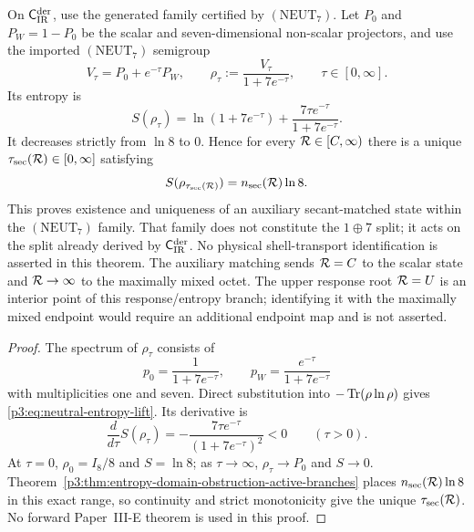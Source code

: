 \documentclass[12pt,a4paper]{article}
\begin{document}
\begin{theorem}
\label{p3:thm:basis-neutral-entropy-lift}
On \(\mathsf C_{\rm IR}^{\rm der}\), use the generated family certified by
\((\mathrm{NEUT}_7)\).
Let \(P_0\) and \(P_W=1-P_0\) be the scalar and seven-dimensional
non-scalar projectors, and use the imported \((\mathrm{NEUT}_7)\) semigroup
\[
 V_\tau=P_0+e^{-\tau}P_W,
 \qquad
 \rho_\tau:=\frac{V_\tau}{1+7e^{-\tau}},
 \qquad \tau\in[0,\infty].
\]
Its entropy is
\begin{equation}
\label{p3:eq:neutral-entropy-lift}
 S(\rho_\tau)
 =\ln(1+7e^{-\tau})
  +\frac{7\tau e^{-\tau}}{1+7e^{-\tau}}.
\end{equation}
It decreases strictly from \(\ln8\) to \(0\).  Hence for every
\(\mathcal R\in[C,\infty)\) there is a unique
\(\tau_{\rm sec}(\mathcal R)\in[0,\infty]\) satisfying
\[
 S(\rho_{\tau_{\rm sec}(\mathcal R)})
 =n_{\rm sec}(\mathcal R)\ln8.
\]
This proves existence and uniqueness of an auxiliary secant-matched state
within the \((\mathrm{NEUT}_7)\) family.  That family does not
constitute the \(1\oplus7\) split; it acts on the split already derived by
\(\mathsf C_{\rm IR}^{\rm der}\).  No physical shell-transport
identification is asserted in this theorem.  The auxiliary matching sends
\(\mathcal R=C\) to the scalar state and
\(\mathcal R\to\infty\) to the maximally mixed octet.  The upper response root
\(\mathcal R=U\) is an interior point of this response/entropy branch; identifying
it with the maximally mixed endpoint would require an additional endpoint
map and is not asserted.
\end{theorem}

\begin{proof}
The spectrum of \(\rho_\tau\) consists of
\[
 p_0=\frac1{1+7e^{-\tau}},
 \qquad
 p_W=\frac{e^{-\tau}}{1+7e^{-\tau}}
\]
with multiplicities one and seven.  Direct substitution into
\(-\operatorname{Tr}(\rho\ln\rho)\) gives
\eqref{p3:eq:neutral-entropy-lift}.  Its derivative is
\[
 \frac{d}{d\tau}S(\rho_\tau)
 =-\frac{7\tau e^{-\tau}}{(1+7e^{-\tau})^2}<0
 \qquad(\tau>0).
\]
At \(\tau=0\), \(\rho_0=I_8/8\) and \(S=\ln8\); as
\(\tau\to\infty\), \(\rho_\tau\to P_0\) and \(S\to0\).
Theorem~\ref{p3:thm:entropy-domain-obstruction-active-branches} places
\(n_{\rm sec}(\mathcal R)\ln8\) in this exact range, so continuity and strict
monotonicity give the unique \(\tau_{\rm sec}(\mathcal R)\).  No forward
Paper~III-E theorem is used in this proof.
\end{proof}
\end{document}
